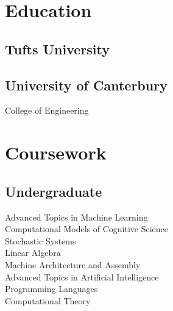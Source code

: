 \documentclass[]{csaund_resume-openfont}
\begin{document}
%
%

%
%

%
%

\begin{minipage}[t]{0.30\textwidth}


\section{Education}

\subsection{Tufts University}
\sectionsep

\subsection{University of Canterbury}
College of Engineering \\
\sectionsep




\section{Coursework}
\subsection{Undergraduate}
Advanced Topics in Machine Learning \\
Computational Models of Cognitive Science \\
Stochastic Systems \\
Linear Algebra \\
Machine Architecture and Assembly \\
Advanced Topics in Artificial Intelligence \\
Programming Languages \\
Computational Theory \\
\sectionsep


\end{minipage}
\end{document}
